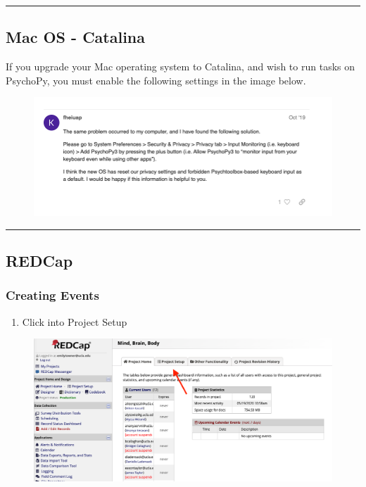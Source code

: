 \documentclass[]{book}
\providecommand{\tightlist}{%
  \setlength{\itemsep}{0pt}\setlength{\parskip}{0pt}}
\begin{document}
\begin{center}\rule{0.5\linewidth}{0.5pt}\end{center}

\subsection{Mac OS - Catalina}\label{mac-os---catalina}

If you upgrade your Mac operating system to Catalina, and wish to run
tasks on PsychoPy, you must enable the following settings in the image
below.

\begin{figure}
\centering
\includegraphics{images/lab_protocols/catalina/1.png}
\caption{}
\end{figure}

\begin{center}\rule{0.5\linewidth}{0.5pt}\end{center}

\subsection{REDCap}\label{redcap}

\subsubsection{Creating Events}\label{creating-events}

\begin{enumerate}
\def\labelenumi{\arabic{enumi}.}
\tightlist
\item
  Click into Project Setup
\end{enumerate}

\begin{figure}
\centering
\includegraphics{images/lab_protocols/redcap/2.png}
\caption{}
\end{figure}
\end{document}

